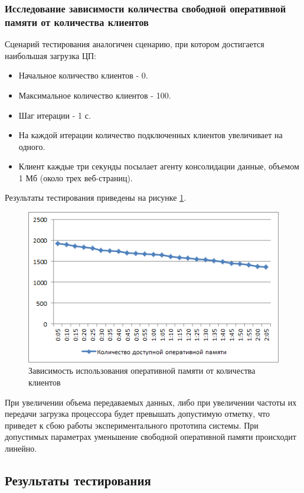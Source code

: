 \documentclass[russian, utf8, emptystyle]{eskdtext}
\begin{document}
\subsubsection{Исследование зависимости количества свободной оперативной памяти от количества клиентов}

Сценарий тестирования аналогичен сценарию, при котором достигается наибольшая загрузка ЦП:
\begin{itemize}
	\item Начальное количество клиентов - 0. 
	\item Максимальное количество клиентов - 100.
	\item Шаг итерации - 1 с.
	\item На каждой итерации количество подключенных клиентов увеличивает на одного.
	\item Клиент каждые три секунды посылает агенту консолидации данные, объемом 1 Мб (около трех веб-страниц).
\end{itemize}
Результаты тестирования приведены на рисунке \ref{fig:test4}. 
\begin{figure}[h]
	\begin{center}
		\includegraphics[width=12cm]{pic/test4.png}
		\caption{Зависимость использования оперативной памяти от количества клиентов}
		\label{fig:test4}
	\end{center}
\end{figure}

При увеличении объема передаваемых данных, либо при увеличении частоты их передачи загрузка процессора будет превышать допустимую отметку, что приведет к сбою работы экспериментального прототипа системы. При допустимых параметрах уменьшение свободной оперативной памяти происходит линейно.
\subsection{Результаты тестирования}
\end{document}
